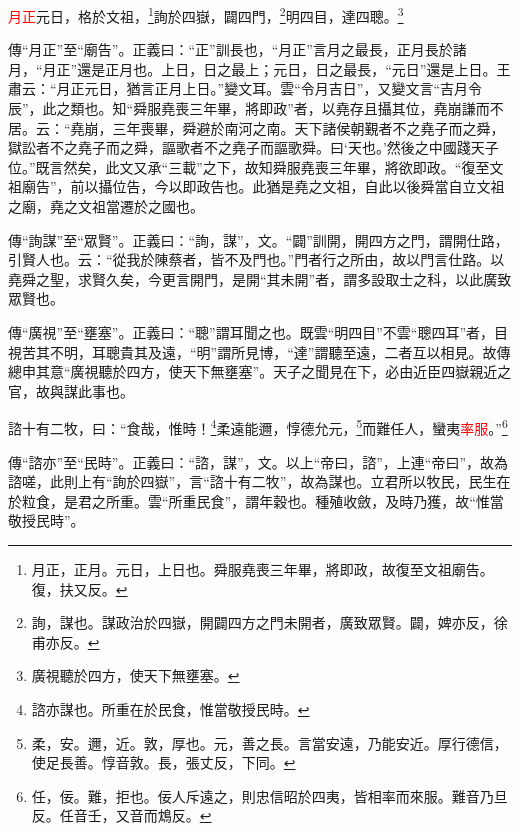 \textcolor{red}{月正}元日，格於文祖，\footnote{月正，正月。元日，上日也。舜服堯喪三年畢，將即政，故復至文祖廟告。復，扶又反。}詢於四嶽，闢四門，\footnote{詢，謀也。謀政治於四嶽，開闢四方之門未開者，廣致眾賢。闢，婢亦反，徐甫亦反。}明四目，達四聰。\footnote{廣視聽於四方，使天下無壅塞。}

{\noindent\zhuan{}\fzbyks 傳“月正”至“廟告”。正義曰：“正”訓長也，“月正”言月之最長，正月長於諸月，“月正”還是正月也。上日，日之最上；元日，日之最長，“元日”還是上日。王肅云：“月正元日，猶言正月上日。”變文耳。雲“令月吉日”，又變文言“吉月令辰”，此之類也。知“舜服堯喪三年畢，將即政”者，以堯存且攝其位，堯崩謙而不居。云：“堯崩，三年喪畢，舜避於南河之南。天下諸侯朝覲者不之堯子而之舜，獄訟者不之堯子而之舜，謳歌者不之堯子而謳歌舜。曰‘天也。’然後之中國踐天子位。”既言然矣，此文又承“三載”之下，故知舜服堯喪三年畢，將欲即政。“復至文祖廟告”，前以攝位告，今以即政告也。此猶是堯之文祖，自此以後舜當自立文祖之廟，堯之文祖當遷於之國也。 \par}

{\noindent\zhuan{}\fzbyks 傳“詢謀”至“眾賢”。正義曰：“詢，謀”，文。“闢”訓開，開四方之門，謂開仕路，引賢人也。云：“從我於陳蔡者，皆不及門也。”門者行之所由，故以門言仕路。以堯舜之聖，求賢久矣，今更言開門，是開“其未開”者，謂多設取士之科，以此廣致眾賢也。 \par}

{\noindent\zhuan{}\fzbyks 傳“廣視”至“壅塞”。正義曰：“聰”謂耳聞之也。既雲“明四目”不雲“聰四耳”者，目視苦其不明，耳聰貴其及遠，“明”謂所見博，“達”謂聽至遠，二者互以相見。故傳總申其意“廣視聽於四方，使天下無壅塞”。天子之聞見在下，必由近臣四嶽親近之官，故與謀此事也。 \par}

諮十有二牧，曰：“食哉，惟時！\footnote{諮亦謀也。所重在於民食，惟當敬授民時。}柔遠能邇，惇德允元，\footnote{柔，安。邇，近。敦，厚也。元，善之長。言當安遠，乃能安近。厚行德信，使足長善。惇音敦。長，張丈反，下同。}而難任人，蠻夷\textcolor{red}{率服}。”\footnote{任，佞。難，拒也。佞人斥遠之，則忠信昭於四夷，皆相率而來服。難音乃旦反。任音壬，又音而鴆反。}

{\noindent\zhuan{}\fzbyks 傳“諮亦”至“民時”。正義曰：“諮，謀”，文。以上“帝曰，諮”，上連“帝曰”，故為諮嗟，此則上有“詢於四嶽”，言“諮十有二牧”，故為謀也。立君所以牧民，民生在於粒食，是君之所重。雲“所重民食”，謂年穀也。種殖收斂，及時乃獲，故“惟當敬授民時”。 \par}

